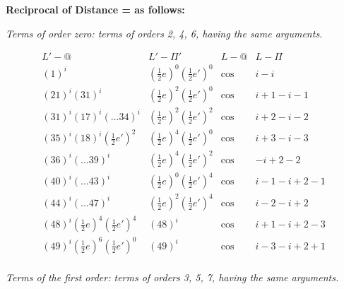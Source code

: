 \documentclass[11pt,a4paper]{article}
\theoremstyle{plain}
\theoremstyle{definition}
\theoremstyle{remark}
\begin{document}
\smallskip
\begin{center}
\textbf{Reciprocal of Distance = as follows:}
\end{center}

\textit{Terms of order zero: terms of orders 2, 4, 6, having the same arguments.}

\[
\begin{array}{cccc}
L'-@ & L'-\Pi' & L-@ & L-\Pi \\
(1)^{i} & (\tfrac12 e)^{0}(\tfrac12 e')^{0} & \cos & i-i \\
(21)^{i}(31)^{i} & (\tfrac12 e)^{2}(\tfrac12 e')^{0} & \cos & i+1-i-1 \\
(31)^{i}(17)^{i}(\dots 34)^{i} & (\tfrac12 e)^{2}(\tfrac12 e')^{2} & \cos & i+2-i-2 \\
(35)^{i}(18)^{i}(\tfrac12 e')^{2} & (\tfrac12 e)^{4}(\tfrac12 e')^{0} & \cos & i+3-i-3 \\
(36)^{i}(\dots 39)^{i} & (\tfrac12 e)^{4}(\tfrac12 e')^{2} & \cos & -i+2-2 \\
(40)^{i}(\dots 43)^{i} & (\tfrac12 e)^{0}(\tfrac12 e')^{4} & \cos & i-1-i+2-1 \\
(44)^{i}(\dots 47)^{i} & (\tfrac12 e)^{2}(\tfrac12 e')^{4} & \cos & i-2-i+2 \\
(48)^{i}(\tfrac12 e)^{4}(\tfrac12 e')^{4} & (48)^{i} & \cos & i+1-i+2-3 \\
(49)^{i}(\tfrac12 e)^{6}(\tfrac12 e')^{0} & (49)^{i} & \cos & i-3-i+2+1 \\
\end{array}
\]

\textit{Terms of the first order: terms of orders 3, 5, 7, having the same arguments.}
\end{document}
